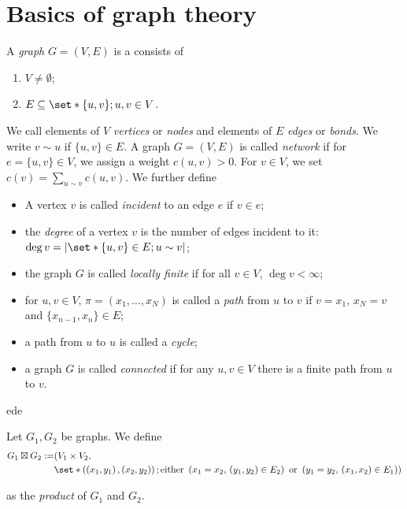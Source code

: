 \section{Basics of graph theory}

\begin{defn}[Graph]
    A \emph{graph} \(G=(V,E)\) is a consists of 
    \begin{enumerate}[1)]
      \item \(V \neq \emptyset\);
      \item \(E \ssq \set*{ \{u,v\}; u,v \in V}\).
    \end{enumerate}
    We call elements of $V$ \emph{vertices} or \emph{nodes} and elements of \(E\) \emph{edges} or \emph{bonds}. We write $v\sim u$ if \(\{u,v\}\in E\). A graph $G=(V,E)$ is called \emph{network} if for $e=\{u,v\} \in V$, we assign a weight $c(u,v)>0$. For $v \in V$, we set $c(v)=\sum_{u \sim v}c(u,v)$. We further define 
    \begin{itemize}
      \item A vertex $v$ is called \emph{incident} to an edge $e$ if $v \in e$;
      \item the \emph{degree} of a vertex $v$ is the number of edges incident to it: \(\operatorname{deg}v= \abs{\set*{\{u,v\}\in E; u\sim v}} \);
      \item the graph $G$ is called \emph{locally finite} if for all $v \in V$, \(\operatorname{deg}v<\infty\);
      \item for $u,v \in V$, $\pi =(x_1,\dots,x_N)$ is called a \emph{path} from $u$ to $v$ if $v=x_1,\, x_N=v$ and $ \{x_{n-1},x_n\} \in E$; 
      \item a path from $u$ to $u$ is called a \emph{cycle};
      \item a graph $G$ is called \emph{connected} if for any $u,v \in V$ there is a finite path from $u$ to $v$.
    \end{itemize}
    
\end{defn}

ede


\begin{defn}
    Let $G_1, G_2$ be graphs. We define  
    \begin{align*} G_1 \boxtimes G_2:= &(V_1\times V_2, \\
      & \set*{\left(\left(x_1,y_1\right),(x_2,y_2)\right); \text{either }\left(x_1=x_2 ,\,(y_1,y_2)\in E_2\right) \text{ or } \left(y_1=y_2,\,(x_1,x_2)\in E_1\right)})
    \end{align*}

    as the \emph{product} of $G_1$ and \(G_2\).
\end{defn}





